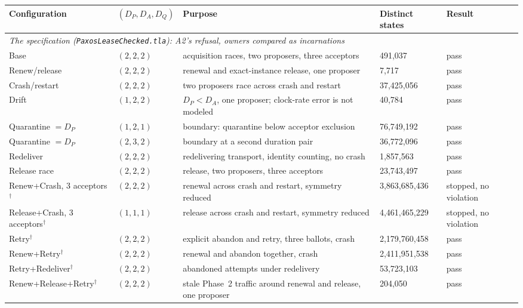 \documentclass[final,5p,times,twocolumn,number]{elsarticle}
\newcommand{\code}[1]{\texttt{#1}}
\begin{document}
\begin{table}[!t]
\centering
\scriptsize
\setlength{\tabcolsep}{4pt}
\renewcommand{\arraystretch}{1.0}
\begin{tabular*}{\textwidth}{@{\extracolsep{\fill}}lllll}
\toprule
\textbf{Configuration} & \textbf{$(D_P, D_A, D_Q)$} & \textbf{Purpose} & \textbf{Distinct states} & \textbf{Result} \\
\midrule[\heavyrulewidth]
\multicolumn{5}{l}{\emph{The specification (\code{PaxosLeaseChecked.tla}): A2's refusal, owners compared as incarnations}} \\
Base & $(2,2,2)$ & acquisition races, two proposers, three acceptors & 491,037 & pass \\
Renew/release & $(2,2,2)$ & renewal and exact-instance release, one proposer & 7,717 & pass \\
Crash/restart & $(2,2,2)$ & two proposers race across crash and restart & 37,425,056 & pass \\
Drift & $(1,2,2)$ & $D_P < D_A$, one proposer; clock-rate error is not modeled & 40,784 & pass \\
Quarantine $=D_P$ & $(1,2,1)$ & boundary: quarantine below acceptor exclusion & 76,749,192 & pass \\
Quarantine $=D_P$ & $(2,3,2)$ & boundary at a second duration pair & 36,772,096 & pass \\
Redeliver & $(2,2,2)$ & redelivering transport, identity counting, no crash & 1,857,563 & pass \\
Release race & $(2,2,2)$ & release, two proposers, three acceptors & 23,743,497 & pass \\
Renew+Crash, 3 acceptors$^\dagger$ & $(2,2,2)$ & renewal across crash and restart, symmetry reduced & 3,863,685,436 & stopped, no violation \\
Release+Crash, 3 acceptors$^\dagger$ & $(1,1,1)$ & release across crash and restart, symmetry reduced & 4,461,465,229 & stopped, no violation \\
Retry$^\dagger$ & $(2,2,2)$ & explicit abandon and retry, three ballots, crash & 2,179,760,458 & pass \\
Renew+Retry$^\dagger$ & $(2,2,2)$ & renewal and abandon together, crash & 2,411,951,538 & pass \\
Retry+Redeliver$^\dagger$ & $(2,2,2)$ & abandoned attempts under redelivery & 53,723,103 & pass \\
Renew+Release+Retry$^\dagger$ & $(2,2,2)$ & stale Phase~2 traffic around renewal and release, one proposer & 204,050 & pass \\

\end{tabular*}
\end{table}
\end{document}
